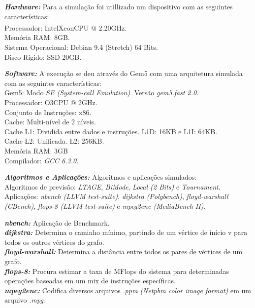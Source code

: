 \documentclass[12pt]{article}
\begin{document}
\begin{description}
\item \textbf{\textit{Hardware:}} Para a simulação foi utillizado um dispositivo com as seguintes características: \\
Processador: Intel\textsuperscript\textregistered  Xeon\textsuperscript\textregistered  CPU @ 2.20GHz.\\
Memória RAM: 8GB.\\
Sistema Operacional: Debian 9.4 (Stretch) 64 Bits.\\
Disco Rígido: SSD 20GB.\\

\item \textbf{\textit{Software:}} A execução se deu através do Gem5 com uma arquitetura simulada com as seguintes características:\\
Gem5: Modo \textit{SE (System-call Emulation)}. Versão \textit{gem5.fast 2.0}.\\
Processador: O3CPU @ 2GHz.\\
Conjunto de Instruções: x86.\\
Cache: Multi-nível de 2 níveis.\\
Cache L1: Dividida entre dados e instruções. L1D: 16KB e L1I: 64KB.\\
Cache L2: Unificada. L2: 256KB.\\
Memória RAM: 3GB\\
Compilador: \textit{GCC 6.3.0}.

\item \textbf{\textit{Algoritmos e Aplicações:}} Algoritmos e aplicações simulados:\\
Algoritmos de previsão: \textit{LTAGE}, \textit{BiMode}, \textit{Local (2 Bits)} e \textit{Tournament}. 
Aplicações: \textit{nbench (LLVM test-suite)}, \textit{dijkstra (Polybench)}, \textit{floyd-warshall (CBench)}, \textit{flops-8 (LLVM test-suite)} 
e \textit{mpeg2enc (MediaBench II)}. 

 \textbf{\textit{nbench:}} Aplicação de Benchmark.\\
 \textbf{\textit{dijkstra:}} Determina o caminho mínimo, partindo de um vértice de início v para todos os outros vértices do grafo.\\
 \textbf{\textit{floyd-warshall:}} Determina a distância entre todos os pares de vértices de um grafo.\\
 \textbf{\textit{flops-8:}} Procura estimar a taxa de MFlops do sistema para determinadas operações baseadas em um mix de instruções específicas.\\
 \textbf{\textit{mpeg2enc:}} Codifica diversos arquivos \textit{.ppm (Netpbm color image format)} em um arquivo \textit{.mpg}.\\

\end{description}
\end{document}
